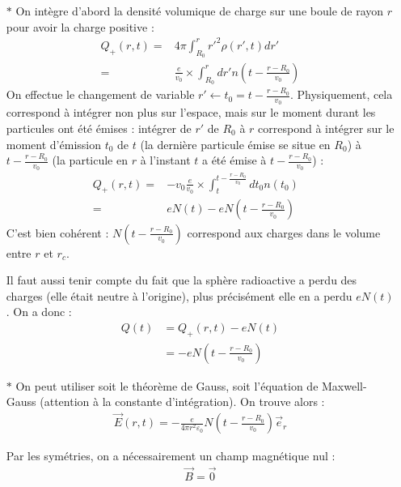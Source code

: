 \documentclass{report}
\begin{document}
\begin{itemize}
	\item[$\ast$] On intègre d'abord la densité volumique de charge sur une boule de rayon $r$ pour avoir la charge positive :
	\begin{align*}
		Q_+(r,t)=&4\pi\int_{R_0}^r r'^2\rho(r',t)dr' \\
		=& \frac{e}{v_0}\times\int_{R_0}^r dr' n\left(t-\frac{r-R_0}{v_0} \right) 
	\end{align*}
	On effectue le changement de variable $r'\longleftarrow t_0=t-\frac{r-R_0}{v_0}$. Physiquement, cela correspond à intégrer non plus sur l'espace, mais sur le moment durant les particules ont été émises : intégrer de $r'$ de $R_0$ à $r$ correspond à intégrer sur le moment d'émission $t_0$ de $t$ (la dernière particule émise se situe en $R_0$) à $t-\frac{r-R_0}{v_0}$ (la particule en $r$ à l'instant $t$ a été émise à $t-\frac{r-R_0}{v_0}$) :
	\begin{align*}
		Q_+(r,t)=&-v_0\frac{e}{v_0}\times\int_{t}^{t-\frac{r-R_0}{v_0}}dt_0 n\left(t_0\right) \\
		=&eN(t)-eN\left( t-\frac{r-R_0}{v_0}\right) &
	\end{align*}
	C'est bien cohérent : $N\left( t-\frac{r-R_0}{v_0}\right)$ correspond aux charges dans le volume entre $r$ et $r_c$. 
	
	Il faut aussi tenir compte du fait que la sphère radioactive a perdu des charges (elle était neutre à l'origine), plus précisément elle en a perdu $eN(t)$. On a donc :
	\begin{align*}
		Q(t)&=Q_+(r,t)-eN(t)\\
		&=-eN\left( t-\frac{r-R_0}{v_0}\right)		
	\end{align*}
	
	\item[$\ast$] On peut utiliser soit le théorème de Gauss, soit l'équation de Maxwell-Gauss (attention à la constante d'intégration). On trouve alors :
	\begin{align*}
		\vec{E}(r,t) = -\frac{e}{4\pi r^2\varepsilon_0}N\left( t-\frac{r-R_0}{v_0}\right)\vec{e}_r
	\end{align*}
	
	Par les symétries, on a nécessairement un champ magnétique nul :
	\begin{align*}
		\vec{B}=\vec{0}
	\end{align*}
	

\end{itemize}
\end{document}
